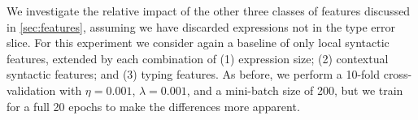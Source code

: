 We investigate the relative impact of the other
three classes of features discussed in \autoref{sec:features}, assuming
we have discarded expressions not in the type error slice.
%
For this experiment we consider again a baseline of only local syntactic
features, extended by each combination of
%
(1) expression size;
(2) contextual syntactic features; and
(3) typing features.
%
As before, we perform a 10-fold cross-validation with $\eta = 0.001$,
$\lambda = 0.001$, and a mini-batch size of 200, but we
train for a full 20 epochs to make the differences more apparent.
%
